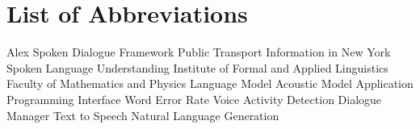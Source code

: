 \chapter*{List of Abbreviations}

\begin{acronym}[TDMA]
     {Alex Spoken Dialogue Framework}
     {Public Transport Information in New York}
     {Spoken Language Understanding}
     {Institute of Formal and Applied Linguistics}
     {Faculty of Mathematics and Physics}
     {Language Model}
     {Acoustic Model}
     {Application Programming Interface}
     {Word Error Rate}
     {Voice Activity Detection}
     {Dialogue Manager}
     {Text to Speech}
     {Natural Language Generation}
\end{acronym}

